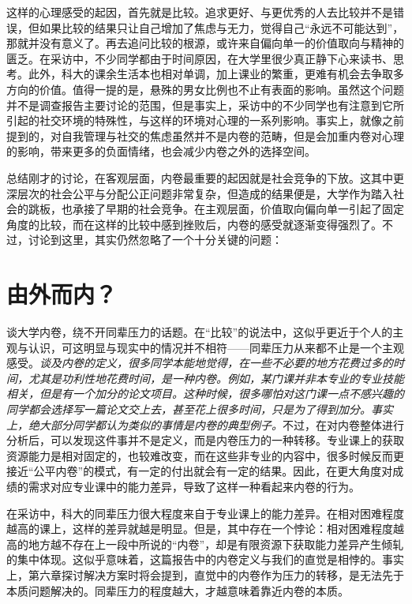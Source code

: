 \documentclass[UTF8,a4paper,fontset=windows,11pt,openany]{ctexbook}
\begin{document}
这样的心理感受的起因，首先就是比较。追求更好、与更优秀的人去比较并不是错误，但如果比较的结果只让自己增加了焦虑与无力，觉得自己“永远不可能达到”，那就并没有意义了。再去追问比较的根源，或许来自偏向单一的价值取向与精神的匮乏。在采访中，不少同学都由于时间原因，在大学里很少真正静下心来读书、思考。此外，科大的课余生活本也相对单调，加上课业的繁重，更难有机会去争取多方向的价值。值得一提的是，悬殊的男女比例也不止有表面的影响。虽然这个问题并不是调查报告主要讨论的范围，但是事实上，采访中的不少同学也有注意到它所引起的社交环境的特殊性，与这样的环境对心理的一系列影响。事实上，就像之前提到的，对自我管理与社交的焦虑虽然并不是内卷的范畴，但是会加重内卷对心理的影响，带来更多的负面情绪，也会减少内卷之外的选择空间。

总结刚才的讨论，在客观层面，内卷最重要的起因就是社会竞争的下放。这其中更深层次的社会公平与分配公正问题非常复杂，但造成的结果便是，大学作为踏入社会的跳板，也承接了早期的社会竞争。在主观层面，价值取向偏向单一引起了固定角度的比较，而在这样的比较中感到挫败后，内卷的感受就逐渐变得强烈了。不过，讨论到这里，其实仍然忽略了一个十分关键的问题：

\section{由外而内？}

谈大学内卷，绕不开同辈压力的话题。在“比较”的说法中，这似乎更近于个人的主观与认识，可这明显与现实中的情况并不相符——同辈压力从来都不止是一个主观感受。\emph{谈及内卷的定义，很多同学本能地觉得，在一些不必要的地方花费过多的时间，尤其是功利性地花费时间，是一种内卷。例如，某门课并非本专业的专业技能相关，但是有一个加分的论文项目。这种时候，很多哪怕对这门课一点不感兴趣的同学都会选择写一篇论文交上去，甚至花上很多时间，只是为了得到加分。事实上，绝大部分同学都认为类似的事情是内卷的典型例子。}不过，在对内卷整体进行分析后，可以发现这件事并不是定义，而是内卷压力的一种转移。专业课上的获取资源能力是相对固定的，也较难改变，而在这些非专业的内容中，很多时候反而更接近“公平内卷”的模式，有一定的付出就会有一定的结果。因此，在更大角度对成绩的需求对应专业课中的能力差异，导致了这样一种看起来内卷的行为。

在采访中，科大的同辈压力很大程度来自于专业课上的能力差异。在相对困难程度越高的课上，这样的差异就越是明显。但是，其中存在一个悖论：相对困难程度越高的地方越不存在上一段中所说的“内卷”，却是有限资源下获取能力差异产生倾轧的集中体现。这似乎意味着，这篇报告中的内卷定义与我们的直觉是相悖的。事实上，第六章探讨解决方案时将会提到，直觉中的内卷作为压力的转移，是无法先于本质问题解决的。同辈压力的程度越大，才越意味着靠近内卷的本质。
\end{document}
